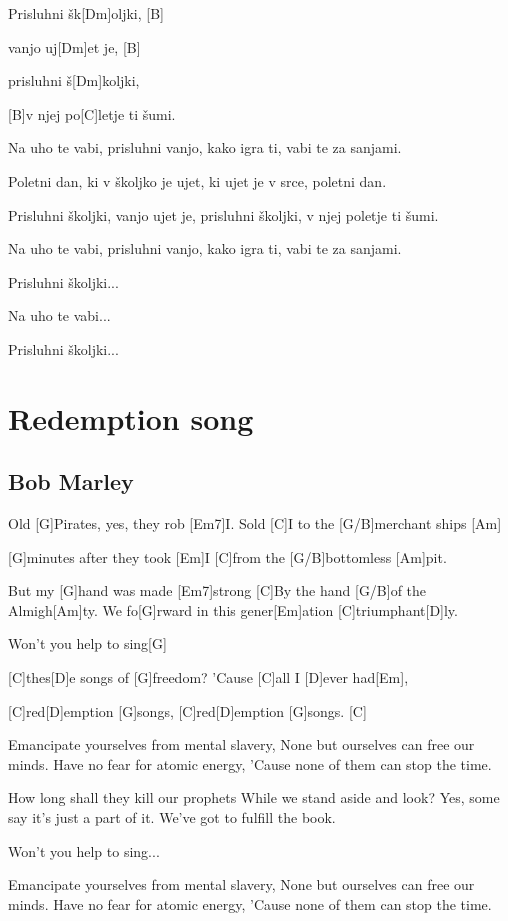 \documentclass[a4paper,12pt]{article}
\begin{document}
\begin{multicols}{2}
\begin{guitar}
Prisluhni šk[Dm]oljki, [B]

vanjo uj[Dm]et je, [B]
           
prisluhni š[Dm]koljki, 
          
[B]v njej po[C]letje ti šumi. 


Na uho te vabi, 
prisluhni vanjo, 
kako igra ti, 
vabi te za sanjami. 


Poletni dan, ki v školjko je ujet, 
ki ujet je v srce, poletni dan. 


Prisluhni školjki, 
vanjo ujet je, 
prisluhni školjki, 
v njej poletje ti šumi. 


Na uho te vabi, 
prisluhni vanjo, 
kako igra ti, 
vabi te za sanjami. 


Prisluhni školjki... 


Na uho te vabi... 


Prisluhni školjki... 

\end{guitar}
\section{Redemption song}
\subsection*{Bob Marley}
\begin{guitar}

Old [G]Pirates, yes, they rob [Em7]I.
Sold [C]I to the [G/B]merchant ships [Am]

[G]minutes after they took [Em]I 
[C]from the [G/B]bottomless [Am]pit.


But my [G]hand was made [Em7]strong
[C]By the hand [G/B]of the Almigh[Am]ty.
We fo[G]rward in this gener[Em]ation [C]triumphant[D]ly.


Won't you help to sing[G]   \

[C]thes[D]e songs of [G]freedom?
'Cause [C]all I [D]ever had[Em],    

[C]red[D]emption [G]songs,
[C]red[D]emption [G]songs. [C]
   
   
Emancipate yourselves from mental slavery,
None but ourselves can free our minds.
Have no fear for atomic energy,
'Cause none of them can stop the time.


How long shall they kill our prophets
While we stand aside and look?
Yes, some say it's just a part of it.
We've got to fulfill the book.

Won't you help to sing...

Emancipate yourselves from mental slavery,
None but ourselves can free our minds.
Have no fear for atomic energy,
'Cause none of them can stop the time.



\end{guitar}
\end{multicols}
\end{document}
